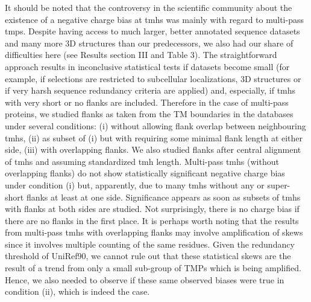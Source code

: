 It should be noted that the controversy in the scientific community about the existence of a negative charge bias at \gls{tmh}s was mainly with regard to multi-pass \gls{tmp}s.
Despite having access to much larger, better annotated sequence datasets and many more 3D structures than our predecessors, we also had our share of difficulties here (see Results section III and Table 3).
The straightforward approach results in inconclusive statistical tests if datasets become small (for example, if selections are restricted to subcellular localizations, 3D structures or if very harsh sequence redundancy criteria are applied) and, especially, if \gls{tmh}s with very short or no flanks are included.
Therefore in the case of multi-pass proteins, we studied flanks as taken from the TM boundaries in the databases under several conditions: (i) without allowing flank overlap between neighbouring \gls{tmh}s, (ii) as subset of (i) but with requiring some minimal flank length at either side, (iii) with overlapping flanks.
We also studied flanks after central alignment of \gls{tmh}s and assuming standardized \gls{tmh} length.
Multi-pass \gls{tmh}s (without overlapping flanks) do not show statistically significant negative charge bias under condition (i) but, apparently, due to many \gls{tmh}s without any or super-short flanks at least at one side.
Significance appears as soon as subsets of \gls{tmh}s with flanks at both sides are studied.
Not surprisingly, there is no charge bias if there are no flanks in the first place.
It is perhaps worth noting that the results from multi-pass \gls{tmh}s with overlapping flanks may involve amplification of skews since it involves multiple counting of the same residues.
Given the redundancy threshold of UniRef90, we cannot rule out that these statistical skews are the result of a trend from only a small sub-group of TMPs which is being amplified.
Hence, we also needed to observe if these same observed biases were true in condition (ii), which is indeed the case.

